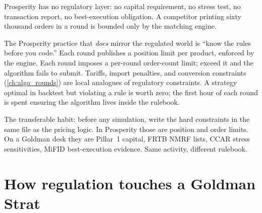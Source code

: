 \begin{prosperitybox}[title={Rules before code}]
Prosperity has no regulatory layer: no capital requirement, no
stress test, no transaction report, no best-execution
obligation.  A competitor printing sixty thousand orders in a
round is bounded only by the matching engine.

The Prosperity practice that \emph{does} mirror the regulated
world is ``know the rules before you code.''  Each round
publishes a position limit per product, enforced by the engine.
Each round imposes a per-round order-count limit; exceed it and
the algorithm fails to submit.  Tariffs, import penalties, and
conversion constraints (\cref{ch:algo_rounds}) are local
analogues of regulatory constraints.  A strategy optimal in
backtest but violating a rule is worth zero; the first hour of
each round is spent ensuring the algorithm lives inside the
rulebook.

The transferable habit: before any simulation, write the hard
constraints in the same file as the pricing logic.  In
Prosperity those are position and order limits.  On a Goldman
desk they are Pillar~1 capital, FRTB NMRF lists, CCAR stress
sensitivities, MiFID best-execution evidence.  Same activity,
different rulebook.
\end{prosperitybox}


\section{How regulation touches a Goldman Strat}
\label{sec:gs_reg}

